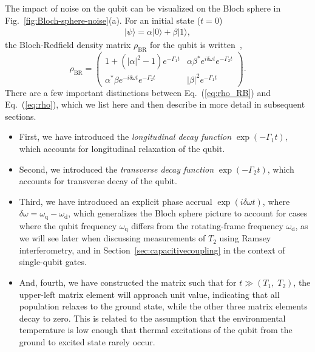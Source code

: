 \documentclass[aip,apr,twocolumn,showpacs,superscriptaddress,groupedaddress,nofootinbib,reprint]{revtex4-1}  %
\begin{document}
The impact of noise on the qubit can be visualized on the Bloch sphere in Fig.~\ref{fig:Bloch-sphere-noise}(a). For an initial state ($t=0$)
\begin{align}
    \lvert \psi \rangle = \alpha |0 \rangle + \beta |1\rangle,
\end{align}
the Bloch-Redfield density matrix $\rho_{\textrm{BR}}$ for the qubit is written~\cite{IthierPhD2005,Ithier2005},
%
\begin{equation}
\label{eq:rho_RB}
    \rho_{\textrm{BR}} =
    \left(
        \begin{matrix}
            1 + (|\alpha|^2-1) e^{- \Gamma_1 t} & \alpha \beta^* e^{i \delta \omega t} e^{- \Gamma_2 t} \\
            \alpha^* \beta e^{-i \delta \omega t} e^{- \Gamma_2 t} & |\beta|^2 e^{- \Gamma_1 t}
        \end{matrix}
        \right).
\end{equation}
There are a few important distinctions between Eq.~(\ref{eq:rho_RB}) and Eq.~(\ref{eq:rho}), which we list here and then describe in more detail in subsequent sections.
\begin{itemize}
    \item First, we have introduced the \textit{longitudinal decay function} $\exp(-\Gamma_1 t)$, which accounts for longitudinal relaxation of the qubit.
    \item Second, we introduced the \textit{transverse decay function} $\exp(-\Gamma_2 t)$, which accounts for transverse decay of the qubit.
    \item Third, we have introduced an explicit phase accrual $\exp(i \delta \omega t)$, where $\delta \omega = \omega_{\textrm{q}} - \omega_{\textrm{d}}$, which generalizes the Bloch sphere picture to account for cases where the qubit frequency $\omega_{\textrm{q}}$ differs from the rotating-frame frequency $\omega_{\textrm{d}}$, as we will see later when discussing measurements of $T_2$ using Ramsey interferometry\cite{Ramsey1950,Hahn1950}, and in Section~\ref{sec:capacitivecoupling} in the context of single-qubit gates.
    \item And, fourth, we have constructed the matrix such that for $t \gg (T_1, \; T_2)$, the upper-left matrix element will approach unit value, indicating that all population relaxes to the ground state, while the other three matrix elements decay to zero. This is related to the assumption that the environmental temperature is low enough that thermal excitations of the qubit from the ground to excited state rarely occur.
\end{itemize}
\end{document}

